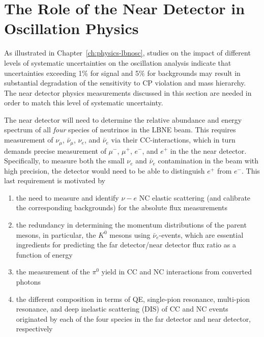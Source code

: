 \section{The Role of the Near Detector in Oscillation Physics} 
\label{sec-nd-oscl} 

As illustrated in Chapter~\ref{ch:physics-lbnosc}, studies on the
impact of different levels of systematic uncertainties on the
oscillation analysis indicate that uncertainties exceeding 1\% for
signal and 5\% for backgrounds may result in substantial degradation
of the sensitivity to CP violation and mass hierarchy.
The near detector physics measurements discussed in this section are
needed in order to match this level of systematic uncertainty.

The near detector will need to determine the relative abundance and
energy spectrum of all \textit{four} species of neutrinos in the LBNE
beam.
%
This requires measurement of $\nu_\mu$, $\bar \nu_\mu$, $\nu_e$, and
$\bar \nu_e$ via their CC-interactions, which in turn demands precise
measurement of $\mu^-$, $\mu^+$, $e^-$, and $e^+$ in the the near
detector. Specifically, to measure both the small $\nu_e$ and $\bar
\nu_e$ contamination in the beam with high precision, the detector
would need to be able to distinguish $e^+$ from $e^-$.  This last
requirement is motivated by
\begin{enumerate}
\item the need to measure and identify $\nu - e$ NC elastic scattering
  (and calibrate the corresponding backgrounds) for the absolute flux
  measurements
\item the redundancy in determining the momentum distributions of the
  parent mesons, in particular, the $K^0$ mesons using $\bar
  \nu_e$-events, which are essential ingredients for predicting the
  far detector/near detector flux ratio as a function of energy
\item the measurement of the $\pi^0$ yield in CC and NC interactions 
from converted photons
\item the different composition in terms of QE, single-pion resonance,
  multi-pion resonance, and deep inelastic scattering (DIS) of CC and
  NC events originated by each of the four species in the far detector
  and near detector, respectively
\end{enumerate}


